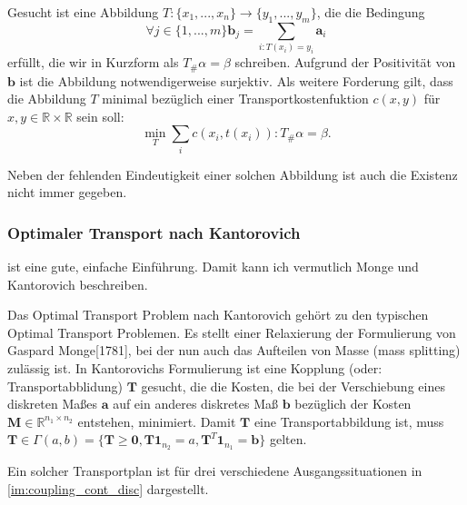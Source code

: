 \documentclass[11pt,a4paper]{article}
\numberwithin{equation}{section}
\begin{document}
	Gesucht ist eine Abbildung $T:\lbrace x_1, ..., x_n \rbrace \to \lbrace y_1,...,y_m \rbrace$, die die Bedingung 
	\begin{equation}
		\forall j \in \lbrace 1,...,m \rbrace \boldsymbol{b}_j= \sum_{i:T(x_i)=y_i}{\boldsymbol{a}_i}
	\end{equation}
	erfüllt, die wir in Kurzform als $T_\#\alpha = \beta$ schreiben. Aufgrund der Positivität von $\boldsymbol{b}$ ist die Abbildung notwendigerweise surjektiv.
	Als weitere Forderung gilt, dass die Abbildung $T$ minimal bezüglich einer Transportkostenfuktion $c(x,y)$ für $x,y \in \mathbb{R} \times \mathbb{R}$ sein soll:
	\begin{equation}
		\min_T{\sum_i{c(x_i, t(x_i)) : T_\#\alpha =  \beta}}.
	\end{equation} 
	
	Neben der fehlenden Eindeutigkeit einer solchen Abbildung ist auch die Existenz nicht immer gegeben.
			
	\subsubsection{Optimaler Transport nach Kantorovich}
	\cite{santambrogio2010introduction} ist eine gute, einfache Einführung. Damit kann ich vermutlich Monge und Kantorovich beschreiben.
	
	Das Optimal Transport Problem nach Kantorovich gehört zu den typischen Optimal Transport Problemen. Es stellt einer Relaxierung der Formulierung von Gaspard Monge[1781], bei der nun auch das Aufteilen von Masse (mass splitting) zulässig ist.
	In Kantorovichs Formulierung ist eine Kopplung (oder: Transportabblidung) $\boldsymbol{T}$ gesucht, die die Kosten, die bei der Verschiebung eines diskreten Maßes $\boldsymbol{a}$ auf ein anderes diskretes Maß $\boldsymbol{b}$ bezüglich der Kosten $\boldsymbol{M} \in \mathbb{R}^{n_1 \times n_2}$ entstehen, minimiert.
	Damit $\boldsymbol{T}$ eine Transportabbildung ist, muss $\boldsymbol{T} \in \Gamma(a,b) = \lbrace \boldsymbol{T} \geq \boldsymbol{0}, \boldsymbol{T}\boldsymbol{1}_{n_2} = a, \boldsymbol{T}^{T}\boldsymbol{1}_{n_1} = \boldsymbol{b} \rbrace$ gelten.
	
	Ein solcher Transportplan ist für drei verschiedene Ausgangssituationen in \autoref{im:coupling_cont_disc} dargestellt.
	
\end{document}
